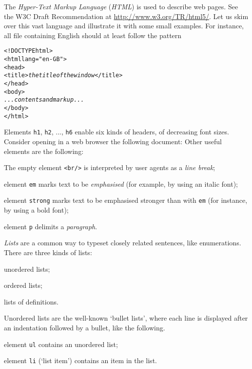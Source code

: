 The \emph{Hyper-Text Markup Language} (\emph{\textsf{HTML}}) is used
to describe web pages. See the W3C Draft Recommendation at
\url{http://www.w3.org/TR/html5/}. Let us skim over this vast language
and illustrate it with some small examples. For instance, all \HTML
file containing English should at least follow the pattern
\begin{alltt}
<!DOCTYPE html>
<html lang="en-GB">
  <head>
    <title>\textit{the title of the window}</title>
  </head>
  <body>
     \emph{...contents and markup...}
  </body>
</html>
\end{alltt}
Elements \texttt{h1}, \texttt{h2}, ..., \texttt{h6} enable six kinds
of headers, of decreasing font sizes. Consider opening in a web
browser the following document: 
\noindent Other useful elements are the following:
\begin{itemize*}

  \item The empty element \texttt{<br/>} is interpreted by
    user agents as a \emph{line break};

  \item element \texttt{em} marks text to be \emph{emphasised}
    (for example, by using an italic font);

  \item element \texttt{strong} marks text to be emphasised stronger
    than with \texttt{em} (for instance, by using a bold font);

  \item element \texttt{p} delimits a \emph{paragraph}.

\end{itemize*}
\emph{Lists} are a common way to typeset closely related sentences,
like enumerations. There are three kinds of lists:
\begin{enumerate*}

  \item unordered lists;

  \item ordered lists;

  \item lists of definitions.

\end{enumerate*}
Unordered lists are the well\hyp{}known `bullet lists', where each
line is displayed after an indentation followed by a bullet, like the
following.
\begin{itemize*}

  \item element \texttt{ul} contains an unordered list;

  \item element \texttt{li} (`list item') contains an item in the
    list.

\end{itemize*}

